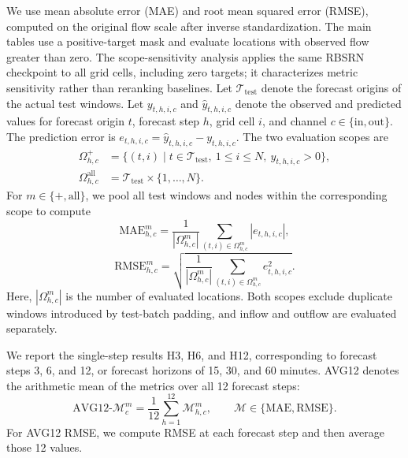 We use mean absolute error (MAE) and root mean squared error (RMSE), computed on the original flow scale after inverse standardization. The main tables use a positive-target mask and evaluate locations with observed flow greater than zero. The scope-sensitivity analysis applies the same RBSRN checkpoint to all grid cells, including zero targets; it characterizes metric sensitivity rather than reranking baselines. Let \(\mathcal{T}_{\mathrm{test}}\) denote the forecast origins of the actual test windows. Let \(y_{t,h,i,c}\) and \(\widehat y_{t,h,i,c}\) denote the observed and predicted values for forecast origin \(t\), forecast step \(h\), grid cell \(i\), and channel \(c\in\{\mathrm{in},\mathrm{out}\}\). The prediction error is \(e_{t,h,i,c}=\widehat y_{t,h,i,c}-y_{t,h,i,c}\). The two evaluation scopes are
\[
\begin{aligned}
	\Omega^{+}_{h,c}&=\bigl\{(t,i)\mid t\in\mathcal{T}_{\mathrm{test}},\ 1\leq i\leq N,\ y_{t,h,i,c}>0\bigr\},\\
	\Omega^{\mathrm{all}}_{h,c}&=\mathcal{T}_{\mathrm{test}}\times\{1,\ldots,N\}.
\end{aligned}
\]
For \(m\in\{+,\mathrm{all}\}\), we pool all test windows and nodes within the corresponding scope to compute
\begin{equation}
	\label{eq:eval-mae}
	\mathrm{MAE}^{m}_{h,c}
	=\frac{1}{|\Omega^{m}_{h,c}|}
	\sum_{(t,i)\in\Omega^{m}_{h,c}}|e_{t,h,i,c}|,
\end{equation}
\begin{equation}
	\label{eq:eval-rmse}
	\mathrm{RMSE}^{m}_{h,c}
	=\sqrt{\frac{1}{|\Omega^{m}_{h,c}|}
		\sum_{(t,i)\in\Omega^{m}_{h,c}}e_{t,h,i,c}^{2}}.
\end{equation}
Here, \(|\Omega^{m}_{h,c}|\) is the number of evaluated locations. Both scopes exclude duplicate windows introduced by test-batch padding, and inflow and outflow are evaluated separately.

We report the single-step results H3, H6, and H12, corresponding to forecast steps 3, 6, and 12, or forecast horizons of 15, 30, and 60 minutes. AVG12 denotes the arithmetic mean of the metrics over all 12 forecast steps:
\begin{equation}
	\label{eq:eval-avg12}
	\mathrm{AVG12}\text{-}\mathcal{M}^{m}_{c}
	=\frac{1}{12}\sum_{h=1}^{12}\mathcal{M}^{m}_{h,c},
	\qquad\mathcal{M}\in\{\mathrm{MAE},\mathrm{RMSE}\}.
\end{equation}
For AVG12 RMSE, we compute RMSE at each forecast step and then average those 12 values.

\FloatBarrier










